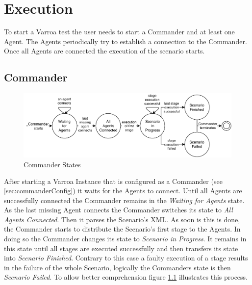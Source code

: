 \chapter{Execution}\label{sec:Execution}
To start a Varroa test the user needs to start a Commander and at least one Agent.
The Agents periodically try to establish a connection to the Commander.
Once all Agents are connected the execution of the scenario starts.
\textsl{}
\section{Commander}
\begin{figure}[H]
	\begin{center}
	\includegraphics[scale=0.9]{Resources/PDF/CommanderStates}
	\caption{Commander States}
	\label{pic:CommanderStates}
	\end{center}
\end{figure}
After starting a Varroa Instance that is configured as a Commander (see \ref{sec:commanderConfig}) it waits for the Agents to connect.
Until all Agents are successfully connected the Commander remains in the \emph{Waiting for Agents} state.
As the last missing Agent connects the Commander switches its state to \emph{All Agents Connected}.
Then it parses the Scenario's XML. As soon is this is done, the Commander starts to distribute the Scenario's first stage to the Agents.
In doing so the Commander changes its state to \emph{Scenario in Progress}.
It remains in this state until all stages are executed successfully and then transfers its state into \emph{Scenario Finished}.
Contrary to this case a faulty execution of a stage results in the failure of the whole Scenario, logically the Commanders state is then \emph{Scenario Failed}.
To allow better comprehension figure \ref{pic:CommanderStates} illustrates this process.

